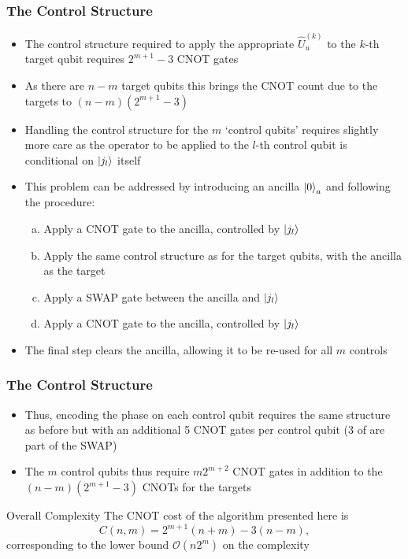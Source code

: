 \documentclass{beamer}
\begin{document}
\begin{frame}
\frametitle{The Control Structure}
\begin{itemize}
\item The control structure required to apply the appropriate $\hat{U}^{(k)}_u$ to the $k$-th target qubit requires \alert{$2^{m+1} -3$ CNOT gates}  
\item As there are $n-m$ target qubits this brings the CNOT count due to the targets to \alert{$(n-m) (2^{m+1}-3)$} 
\item Handling the control structure for the $m$ \alert{`control qubits'} requires slightly more care as the operator to be applied to the $l$-th control qubit is conditional on $\ket{j_l}$ itself 
\item This problem can be addressed by introducing an \alert{ancilla $\ket{0}_a$} and following the procedure:
\begin{enumerate}[(a)]
\item Apply a CNOT gate to the ancilla, controlled by $\ket{j_l}$
\item Apply the same control structure as for the target qubits, with the ancilla as the target 
\item Apply a SWAP gate between the ancilla and $\ket{j_l}$ 
\item Apply a CNOT gate to the ancilla, controlled by $\ket{j_l}$
\end{enumerate}
\item The final step clears the ancilla, allowing it to be \alert{re-used for all $m$} controls
\end{itemize}
\end{frame}


\begin{frame}
\frametitle{The Control Structure}
\begin{itemize}
\item Thus, encoding the phase on each control qubit requires the same structure as before but with an \alert{additional 5 CNOT} gates per control qubit (3 of are part of the SWAP)
\item The $m$ control qubits thus require \alert{$m 2^{m+2}$ CNOT} gates in addition to the \alert{$(n-m) (2^{m+1} -3)$ CNOTs} for the targets
\end{itemize}
\begin{alertblock}{Overall Complexity}
The CNOT cost of the algorithm presented here is 
\begin{equation}
C(n,m) = 2^{m+1} ( n+m) - 3 (n-m), 
\end{equation}
corresponding to the lower bound $\mathcal{O}(n2^m)$ on the complexity
\end{alertblock}
\end{frame}
\end{document}
